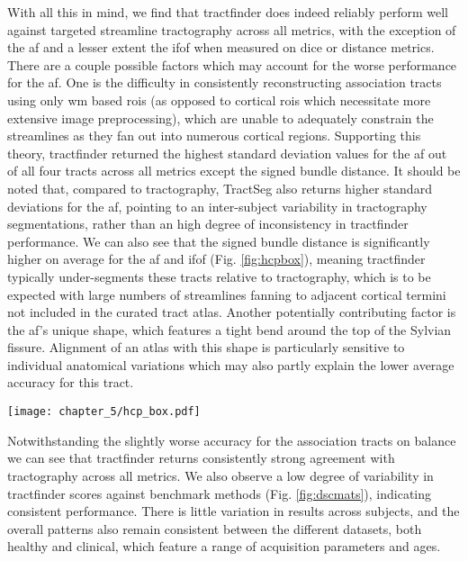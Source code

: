 With all this in mind, we find that tractfinder does indeed reliably perform well against targeted streamline tractography across all metrics, with the exception of the \gls{af} and a lesser extent the \gls{ifof} when measured on \gls{dice} or distance metrics.
There are a couple possible factors which may account for the worse performance for the \gls{af}.
One is the difficulty in consistently reconstructing association tracts using only \gls{wm} based \glspl{roi} (as opposed to cortical \glspl{roi} which necessitate more extensive image preprocessing), which are unable to adequately constrain the streamlines as they fan out into numerous cortical regions.
Supporting this theory, tractfinder returned the highest standard deviation values for the \gls{af} out of all four tracts across all metrics except the signed bundle distance.
It should be noted that, compared to tractography, TractSeg also returns higher standard deviations for the \gls{af}, pointing to an inter-subject variability in tractography segmentations, rather than an high degree of inconsistency in tractfinder performance.
We can also see that the signed bundle distance is significantly higher on average for the \gls{af} and \gls{ifof} (Fig. \ref{fig:hcpbox}), meaning tractfinder typically under-segments these tracts relative to tractography, which is to be expected with large numbers of streamlines fanning to adjacent cortical termini not included in the curated tract atlas.
Another potentially contributing factor is the \gls{af}'s unique shape, which features a tight bend around the top of the Sylvian fissure.
Alignment of an atlas with this shape is particularly sensitive to individual anatomical variations which may also partly explain the lower average accuracy for this tract.

\begin{SCfigure}
  \texttt{[image: chapter\_5/hcp\_box.pdf]}
  \caption[Signed bundle distances to streamline tractography, HCP dataset]{Signed bundle distances for all methods compared against targeted tractography in the  dataset. }
  \label{fig:hcpbox}
\end{SCfigure}

Notwithstanding the slightly worse accuracy for the association tracts on balance we can see that tractfinder returns consistently strong agreement with tractography across all metrics.
We also observe a low degree of variability in tractfinder scores against benchmark methods (Fig. \ref{fig:dscmats}), indicating consistent performance.
There is little variation in results across subjects, and the overall patterns also remain consistent between the different datasets, both healthy and clinical, which feature a range of acquisition parameters and ages.

